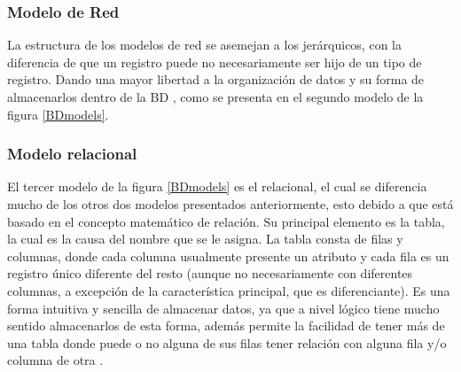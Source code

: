 \subsubsection{Modelo de Red}
\par
La estructura de los modelos de red se asemejan a los jerárquicos, con la diferencia de que un registro puede no necesariamente ser hijo de un tipo de registro. Dando una mayor libertad a la organización de datos y su forma de almacenarlos dentro de la BD \cite{camps_paré_2005}, como se presenta en el segundo modelo de la figura \ref{BDmodels}.

\subsubsection{Modelo relacional}
\par
El tercer modelo de la figura \ref{BDmodels} es el relacional, el cual se diferencia mucho de los otros dos modelos presentados anteriormente, esto debido a que está basado en el concepto matemático de relación. Su principal elemento es la tabla, la cual es la causa del nombre que se le asigna. La tabla consta de filas y columnas, donde cada columna usualmente presente un atributo y cada fila es un registro único diferente del resto (aunque no necesariamente con diferentes columnas, a excepción de la característica principal, que es diferenciante). Es una forma intuitiva y sencilla de almacenar datos, ya que a nivel lógico tiene mucho sentido almacenarlos de esta forma, además permite la facilidad de tener más de una tabla donde puede o no alguna de sus filas tener relación con alguna fila y/o columna de otra \cite{camps_paré_2005}.

\newpage